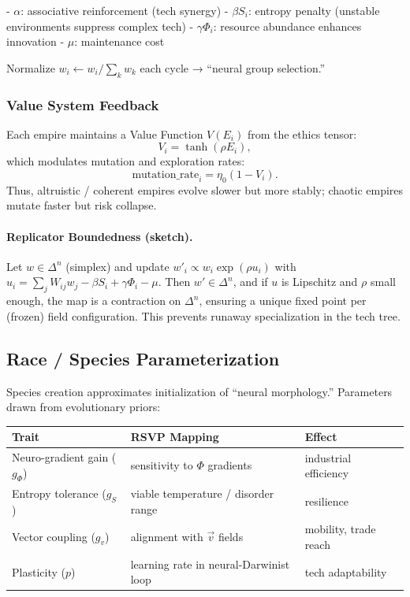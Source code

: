 \documentclass[12pt]{article}
\theoremstyle{definition}
\begin{document}
- $\alpha$: associative reinforcement (tech synergy)
- $\beta S_i$: entropy penalty (unstable environments suppress complex tech)
- $\gamma \Phi_i$: resource abundance enhances innovation
- $\mu$: maintenance cost

Normalize $w_i \leftarrow w_i / \sum_k w_k$ each cycle → “neural group selection.”

\subsubsection{Value System Feedback}
Each empire maintains a Value Function $V(E_i)$ from the ethics tensor:
\[
V_i = \tanh(\rho E_i),
\]
which modulates mutation and exploration rates:
\[
\text{mutation\_rate}_i = \eta_0 (1 - V_i).
\]
Thus, altruistic / coherent empires evolve slower but more stably; chaotic empires mutate faster but risk collapse.

\paragraph{Replicator Boundedness (sketch).}
Let $w \in \Delta^n$ (simplex) and update $w'_i \propto w_i \exp(\rho u_i)$ with
$u_i = \sum_j W_{ij} w_j - \beta S_i + \gamma \Phi_i - \mu$.
Then $w'\in\Delta^n$, and if $u$ is Lipschitz and $\rho$ small enough, the map is a contraction on $\Delta^n$,
ensuring a unique fixed point per (frozen) field configuration. This prevents runaway specialization in the tech tree.

\subsection{Race / Species Parameterization}
Species creation approximates initialization of “neural morphology.” Parameters drawn from evolutionary priors:

\begin{tabular}{lll}
\toprule
Trait & RSVP Mapping & Effect \\
\midrule
Neuro-gradient gain ($g_\Phi$) & sensitivity to $\Phi$ gradients & industrial efficiency \\
Entropy tolerance ($g_S$) & viable temperature / disorder range & resilience \\
Vector coupling ($g_v$) & alignment with $\vec{v}$ fields & mobility, trade reach \\
Plasticity ($p$) & learning rate in neural-Darwinist loop & tech adaptability \\
\bottomrule
\end{tabular}
\end{document}
